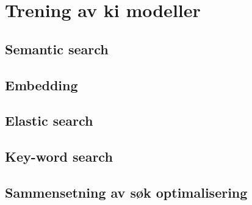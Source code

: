 \section{Trening av ki modeller}

\subsection{Semantic search}

\subsection{Embedding}

\subsection{Elastic search}

\subsection{Key-word search}

\subsection{Sammensetning av søk optimalisering}

